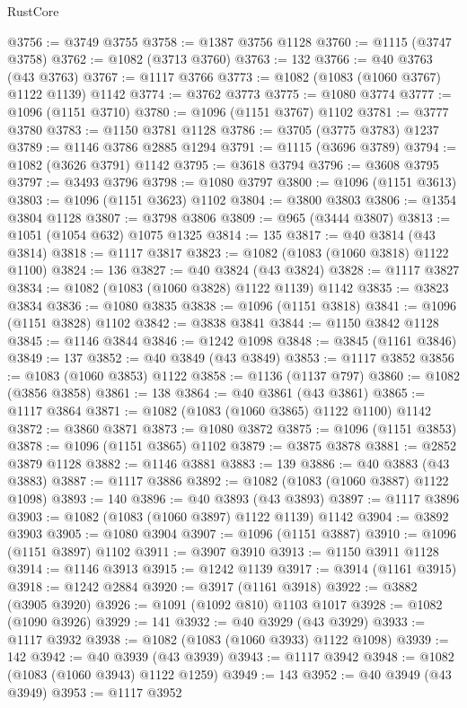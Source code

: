 \begin{lexlean}{RustCore}
\begin{coremodule}
@3756 := @3749 @3755
@3758 := @1387 @3756 @1128
@3760 := @1115 (@3747 @3758)
@3762 := @1082 (@3713 @3760)
@3763 := 132
@3766 := @40 @3763 (@43 @3763)
@3767 := @1117 @3766
@3773 := @1082 (@1083 (@1060 @3767) @1122 @1139) @1142
@3774 := @3762 @3773
@3775 := @1080 @3774
@3777 := @1096 (@1151 @3710)
@3780 := @1096 (@1151 @3767) @1102
@3781 := @3777 @3780
@3783 := @1150 @3781 @1128
@3786 := @3705 (@3775 @3783) @1237
@3789 := @1146 @3786 @2885 @1294
@3791 := @1115 (@3696 @3789)
@3794 := @1082 (@3626 @3791) @1142
@3795 := @3618 @3794
@3796 := @3608 @3795
@3797 := @3493 @3796
@3798 := @1080 @3797
@3800 := @1096 (@1151 @3613)
@3803 := @1096 (@1151 @3623) @1102
@3804 := @3800 @3803
@3806 := @1354 @3804 @1128
@3807 := @3798 @3806
@3809 := @965 (@3444 @3807)
@3813 := @1051 (@1054 @632) @1075 @1325
@3814 := 135
@3817 := @40 @3814 (@43 @3814)
@3818 := @1117 @3817
@3823 := @1082 (@1083 (@1060 @3818) @1122 @1100)
@3824 := 136
@3827 := @40 @3824 (@43 @3824)
@3828 := @1117 @3827
@3834 := @1082 (@1083 (@1060 @3828) @1122 @1139) @1142
@3835 := @3823 @3834
@3836 := @1080 @3835
@3838 := @1096 (@1151 @3818)
@3841 := @1096 (@1151 @3828) @1102
@3842 := @3838 @3841
@3844 := @1150 @3842 @1128
@3845 := @1146 @3844
@3846 := @1242 @1098
@3848 := @3845 (@1161 @3846)
@3849 := 137
@3852 := @40 @3849 (@43 @3849)
@3853 := @1117 @3852
@3856 := @1083 (@1060 @3853) @1122
@3858 := @1136 (@1137 @797)
@3860 := @1082 (@3856 @3858)
@3861 := 138
@3864 := @40 @3861 (@43 @3861)
@3865 := @1117 @3864
@3871 := @1082 (@1083 (@1060 @3865) @1122 @1100) @1142
@3872 := @3860 @3871
@3873 := @1080 @3872
@3875 := @1096 (@1151 @3853)
@3878 := @1096 (@1151 @3865) @1102
@3879 := @3875 @3878
@3881 := @2852 @3879 @1128
@3882 := @1146 @3881
@3883 := 139
@3886 := @40 @3883 (@43 @3883)
@3887 := @1117 @3886
@3892 := @1082 (@1083 (@1060 @3887) @1122 @1098)
@3893 := 140
@3896 := @40 @3893 (@43 @3893)
@3897 := @1117 @3896
@3903 := @1082 (@1083 (@1060 @3897) @1122 @1139) @1142
@3904 := @3892 @3903
@3905 := @1080 @3904
@3907 := @1096 (@1151 @3887)
@3910 := @1096 (@1151 @3897) @1102
@3911 := @3907 @3910
@3913 := @1150 @3911 @1128
@3914 := @1146 @3913
@3915 := @1242 @1139
@3917 := @3914 (@1161 @3915)
@3918 := @1242 @2884
@3920 := @3917 (@1161 @3918)
@3922 := @3882 (@3905 @3920)
@3926 := @1091 (@1092 @810) @1103 @1017
@3928 := @1082 (@1090 @3926)
@3929 := 141
@3932 := @40 @3929 (@43 @3929)
@3933 := @1117 @3932
@3938 := @1082 (@1083 (@1060 @3933) @1122 @1098)
@3939 := 142
@3942 := @40 @3939 (@43 @3939)
@3943 := @1117 @3942
@3948 := @1082 (@1083 (@1060 @3943) @1122 @1259)
@3949 := 143
@3952 := @40 @3949 (@43 @3949)
@3953 := @1117 @3952

\end{coremodule}
\end{lexlean}
